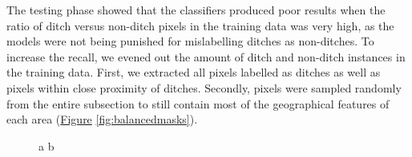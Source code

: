 \documentclass[11pt, review]{elsarticle} %
\begin{document}
The testing phase showed that the classifiers produced poor results when the ratio of ditch versus non-ditch pixels in the training data was very high, as the models were not being punished for mislabelling ditches as non-ditches. To increase the recall, we evened out the amount of ditch and non-ditch instances in the training data. First, we extracted all pixels labelled as ditches as well as pixels within close proximity of ditches. Secondly, pixels were sampled randomly from the entire subsection to still contain most of the geographical features of each area (\hyperref[fig:balancedmasks]{Figure} \ref{fig:balancedmasks}).

\begin{figure} [H]
    \centering
    a{
        }\hspace{5pt}
    b{
}
\end{figure}
\end{document}
